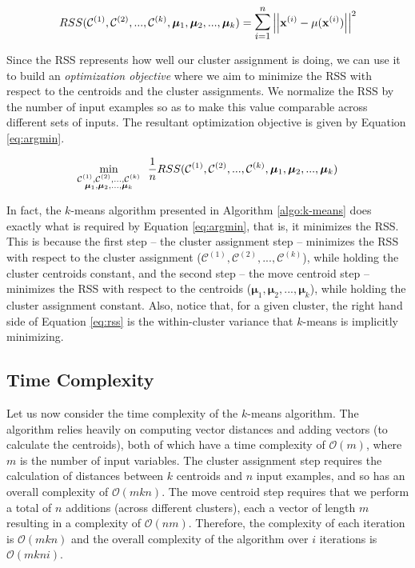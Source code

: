 \begin{equation}
    RSS(\mathcal{C}^{(1)}, \mathcal{C}^{(2)}, ..., \mathcal{C}^{(k)}, \boldsymbol{\mu}_1, \boldsymbol{\mu}_2, ..., \boldsymbol{\mu}_k) = \mathlarger{\mathlarger{\sum}}_{i = 1}^{n} \norm{ \mathbf{x}^{(i)} - \mu(\mathbf{x}^{(i)}) }^2
    \label{eq:rss}
\end{equation}

Since the RSS represents how well our cluster assignment is doing, we can use it to build an \emph{optimization objective} where we aim to minimize the RSS with respect to the centroids and the cluster assignments. We normalize the RSS by the number of input examples so as to make this value comparable across different sets of inputs. The resultant optimization objective is given by Equation \ref{eq:argmin}.

\begin{equation}
    \underset{\rm \substack{ \mathcal{C}^{(1)}, \mathcal{C}^{(2)}, ..., \mathcal{C}^{(k)} \\ \boldsymbol{\mu}_1, \boldsymbol{\mu}_2, ..., \boldsymbol{\mu}_k }}{\rm \text{min}}~~\frac{1}{n} RSS(\mathcal{C}^{(1)}, \mathcal{C}^{(2)}, ..., \mathcal{C}^{(k)}, \boldsymbol{\mu}_1, \boldsymbol{\mu}_2, ..., \boldsymbol{\mu}_k)
    \label{eq:argmin}
\end{equation}

In fact, the $k$-means algorithm presented in Algorithm \ref{algo:k-means} does exactly what is required by Equation \ref{eq:argmin}, that is, it minimizes the RSS. This is because the first step -- the cluster assignment step -- minimizes the RSS with respect to the cluster assignment ($\mathcal{C}^{(1)}, \mathcal{C}^{(2)}, ..., \mathcal{C}^{(k)}$), while holding the cluster centroids constant, and the second step -- the move centroid step -- minimizes the RSS with respect to the centroids ($\boldsymbol{\mu}_1, \boldsymbol{\mu}_2, ..., \boldsymbol{\mu}_k$), while holding the cluster assignment constant. Also, notice that, for a given cluster, the right hand side of Equation \ref{eq:rss} is the within-cluster variance that $k$-means is implicitly minimizing.  

\subsection{Time Complexity}
\label{sec:complexity}
Let us now consider the time complexity of the $k$-means algorithm. The algorithm relies heavily on computing vector distances and adding vectors (to calculate the centroids), both of which have a time complexity of $\mathcal{O}(m)$, where $m$ is the number of input variables. The cluster assignment step requires the calculation of distances between $k$ centroids and $n$ input examples, and so has an overall complexity of $\mathcal{O}(mkn)$. The move centroid step requires that we perform a total of $n$ additions (across different clusters), each a vector of length $m$ resulting in a complexity of $\mathcal{O}(nm)$. Therefore, the complexity of each iteration is $\mathcal{O}(mkn)$ and the overall complexity of the algorithm over $i$ iterations is $\mathcal{O}(mkni)$. 

